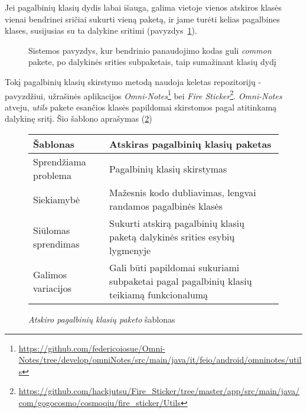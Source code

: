 Jei pagalbinių klasių dydis labai išauga, galima vietoje vienos atskiros klasės vienai bendrinei sričiai sukurti vieną paketą,
ir jame turėti kelias pagalbines klases, susijusias su ta dalykine sritimi (pavyzdys~\ref{fig:common}).
\begin{figure}[H]
\snugshade
{}
\endsnugshade
\caption{Sistemos pavyzdys, kur bendrinio panaudojimo kodas guli \textit{common} pakete, po dalykinės srities subpaketais, taip sumažinant klasių dydį }
\label{fig:common}
\end{figure}
Tokį pagalbinių klasių skirstymo metodą naudoja keletas repozitorijų - pavyzdžiui, užrašinės aplikacijos \textit{Omni-Notes}\footnote{\url{https://github.com/federicoiosue/Omni-Notes/tree/develop/omniNotes/src/main/java/it/feio/android/omninotes/utils}} bei
\textit{Fire Sticker}\footnote{\url{https://github.com/hackjutsu/Fire_Sticker/tree/master/app/src/main/java/com/gogocosmo/cosmoqiu/fire_sticker/Utils}}.
\textit{Omni-Notes} atveju, \textit{utils} pakete esančios klasės papildomai skirstomos pagal atitinkamą dalykinę sritį.
Šio šablono aprašymas (\ref{table:atskiras})
\begin{figure}[H]
\begin{center}
    \begin{tabular}{|p{5cm}|p{10cm}|}
        \hline
        Šablonas & Atskiras pagalbinių klasių paketas \\ [0.5ex]
        \hline\hline
        Sprendžiama problema & Pagalbinių klasių skirstymas\\
        \hline
        Siekiamybė & Mažesnis kodo dubliavimas, lengvai randamos pagalbinės klasės \\
        \hline
        Siūlomas sprendimas & Sukurti atskirą pagalbinių klasių paketą dalykinės srities esybių lygmenyje \\
        \hline
        Galimos variacijos & Gali būti papildomai sukuriami subpaketai pagal pagalbinių klasių teikiamą funkcionalumą \\
        \hline
    \end{tabular}
\end{center}
\caption{\textit{Atskiro pagalbinių klasių paketo} šablonas}
\label{table:atskiras}
\end{figure}

